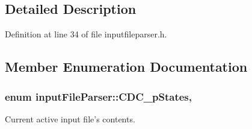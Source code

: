 \subsection{Detailed Description}


Definition at line 34 of file inputfileparser.\+h.



\subsection{Member Enumeration Documentation}
\hypertarget{classinput_file_parser_afc7cd4c5ba9e85faf16c9a7b0fec3782}{
\subsubsection[{C\+D\+C\+\_\+p\+States}]{\setlength{\rightskip}{0pt plus 5cm}enum {\bf input\+File\+Parser\+::\+C\+D\+C\+\_\+p\+States}\hspace{0.3cm}{\ttfamily [strong]}, {\ttfamily [private]}}}\label{classinput_file_parser_afc7cd4c5ba9e85faf16c9a7b0fec3782}


Current active input file's contents. 

